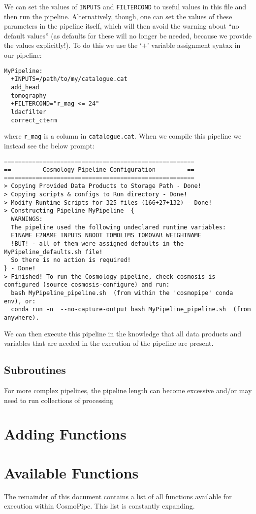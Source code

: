 \documentclass[fleqn,usenatbib]{mnras}
\begin{document}
We can set the values of \texttt{INPUTS} and \texttt{FILTERCOND} to useful values in this file and then run the pipeline. 
Alternatively, though, one can set the values of these parameters in the pipeline itself, which will then avoid the warning 
about ``no default values'' (as defaults for these will no longer be needed, because we provide the values explicitly!). To 
do this we use the `$+$' variable assignment syntax in our pipeline: 
\begin{verbatim}
MyPipeline: 
  +INPUTS=/path/to/my/catalogue.cat
  add_head 
  tomography
  +FILTERCOND="r_mag <= 24"
  ldacfilter
  correct_cterm
\end{verbatim}
where \texttt{r\_mag} is a column in \texttt{catalogue.cat}. When we compile this pipeline we instead see the below prompt: 
\begin{verbatim} 
======================================================
==         Cosmology Pipeline Configuration         ==
======================================================
> Copying Provided Data Products to Storage Path - Done!
> Copying scripts & configs to Run directory - Done!
> Modify Runtime Scripts for 325 files (166+27+132) - Done!
> Constructing Pipeline MyPipeline  {
  WARNINGS:
  The pipeline used the following undeclared runtime variables:
  E1NAME E2NAME INPUTS NBOOT TOMOLIMS TOMOVAR WEIGHTNAME
  !BUT! - all of them were assigned defaults in the MyPipeline_defaults.sh file!
  So there is no action is required!
} - Done!
> Finished! To run the Cosmology pipeline, check cosmosis is configured (source cosmosis-configure) and run:
  bash MyPipeline_pipeline.sh  (from within the 'cosmopipe' conda env), or:
  conda run -n  --no-capture-output bash MyPipeline_pipeline.sh  (from anywhere).
\end{verbatim}
We can then execute this pipeline in the knowledge that all data products and variables that are 
needed in the execution of the pipeline are present. 

\subsection{Subroutines} 
For more complex pipelines, the pipeline length can become excessive and/or may need to run collections of 
processing 


\section{Adding Functions} 


\section{Available Functions} 
The remainder of this document contains a list of all functions available for execution within CosmoPipe. 
This list is constantly expanding. 


\end{document}
